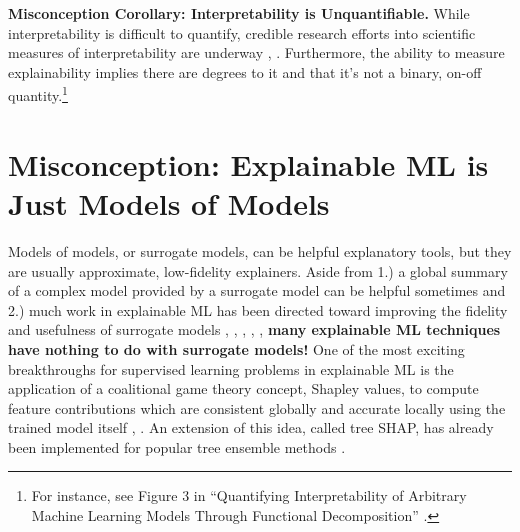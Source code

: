 \documentclass[fleqn]{article}
\begin{document}
\noindent \textbf{Misconception Corollary: Interpretability is Unquantifiable.} While interpretability is difficult to quantify, credible research efforts into scientific measures of interpretability are underway \cite{friedler2019assessing}, \cite{molnar2019quantifying}. Furthermore, the ability to measure explainability implies there are degrees to it and that it's not a binary, on-off quantity.\footnote{For instance, see Figure 3 in ``Quantifying Interpretability of Arbitrary Machine Learning Models Through Functional Decomposition'' \cite{molnar2019quantifying}.}

\section{Misconception: Explainable ML is Just Models of Models}

Models of models, or surrogate models, can be helpful explanatory tools, but they are usually approximate, low-fidelity explainers. Aside from 1.) a global summary of a complex model provided by a surrogate model can be helpful sometimes and 2.) much work in explainable ML has been directed toward improving the fidelity and usefulness of surrogate models \cite{dt_surrogate2}, \cite{viper}, \cite{dt_surrogate1}, \cite{lime-sup}, \cite{wf_xnn}, \textbf{many explainable ML techniques have nothing to do with surrogate models!} One of the most exciting breakthroughs for supervised learning problems in explainable ML is the application of a coalitional game theory concept, Shapley values, to compute feature contributions which are consistent globally and accurate locally using the trained model itself \cite{shapley}, \cite{kononenko2010efficient}. An extension of this idea, called tree SHAP, has already been implemented for popular tree ensemble methods \cite{tree_shap}. 
\end{document}
